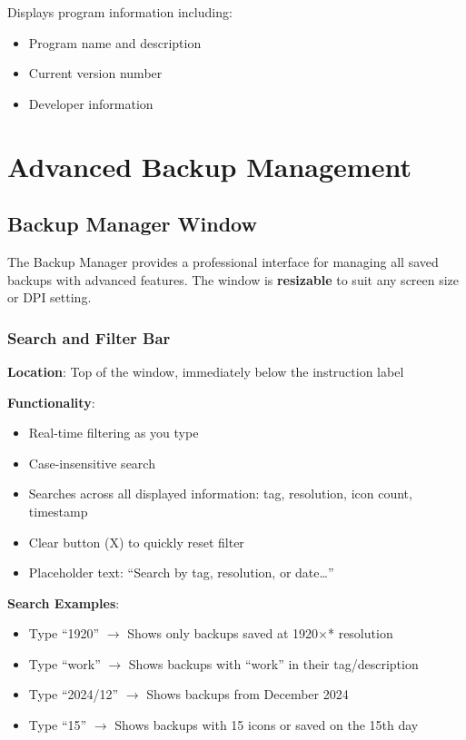 \documentclass[a4paper,11pt]{article}
\begin{document}
Displays program information including:

\begin{itemize}
  \item Program name and description
  \item Current version number
  \item Developer information
\end{itemize}

\section{Advanced Backup Management}

\subsection{Backup Manager Window}

The Backup Manager provides a professional interface for managing all
saved backups with advanced features. The window is \textbf{resizable}
to suit any screen size or DPI setting.

\subsubsection{Search and Filter Bar}

\textbf{Location}: Top of the window, immediately below the instruction label

\textbf{Functionality}:
\begin{itemize}
  \item Real-time filtering as you type
  \item Case-insensitive search
  \item Searches across all displayed information: tag, resolution,
    icon count, timestamp
  \item Clear button (X) to quickly reset filter
  \item Placeholder text: ``Search by tag, resolution, or date\ldots''
\end{itemize}

\textbf{Search Examples}:
\begin{itemize}
  \item Type ``1920'' $\rightarrow$ Shows only backups saved at
    1920$\times$* resolution
  \item Type ``work'' $\rightarrow$ Shows backups with ``work'' in their
    tag/description
  \item Type ``2024/12'' $\rightarrow$ Shows backups from December 2024
  \item Type ``15'' $\rightarrow$ Shows backups with 15 icons or saved
    on the 15th day
\end{itemize}
\end{document}
